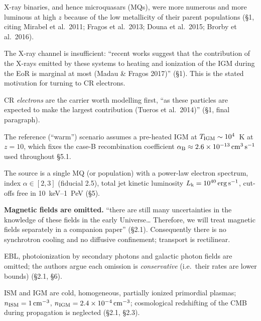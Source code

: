 \documentclass[11pt,a4paper]{article}
\begin{document}
\begin{description}[leftmargin=1.6cm,style=nextline,itemsep=3pt]
\item[\textbf{H1}] X-ray binaries, and hence microquasars (MQs), were more
  numerous and more luminous at high $z$ because of the low metallicity of
  their parent populations (\S1, citing Mirabel et al.\ 2011; Fragos et al.\
  2013; Douna et al.\ 2015; Brorby et al.\ 2016).
\item[\textbf{H2}] The X-ray channel is insufficient: ``recent works suggest
  that the contribution of the X-rays emitted by these systems to heating and
  ionization of the IGM during the EoR is marginal at most (Madau \& Fragos
  2017)'' (\S1). This is the stated motivation for turning to CR electrons.
\item[\textbf{H3}] CR \emph{electrons} are the carrier worth modelling first,
  ``as these particles are expected to make the largest contribution (Tueros
  et al.\ 2014)'' (\S1, final paragraph).
\item[\textbf{H4}] The reference (``warm'') scenario assumes a pre-heated IGM at
  $T_{\rm IGM}\sim10^{4}$~K at $z=10$, which fixes the case-B recombination
  coefficient $\alpha_{\rm B}\approx2.6\times10^{-13}\,{\rm cm^{3}\,s^{-1}}$
  used throughout \S5.1.
\item[\textbf{H5}] The source is a single MQ (or population) with a power-law
  electron spectrum, index $\alpha\in[2,3]$ (fiducial 2.5), total jet kinetic
  luminosity $L_{\rm k}=10^{40}\,{\rm erg\,s^{-1}}$, cut-offs free in
  10~keV--1~PeV (\S5).
\item[\textbf{H6}] \textbf{Magnetic fields are omitted.} ``there are still many
  uncertainties in the knowledge of these fields in the early Universe\dots
  Therefore, we will treat magnetic fields separately in a companion paper''
  (\S2.1). Consequently there is no synchrotron cooling and no diffusive
  confinement; transport is rectilinear.
\item[\textbf{H7}] EBL, photoionization by secondary photons and galactic
  photon fields are omitted; the authors argue each omission is
  \emph{conservative} (i.e.\ their rates are lower bounds) (\S2.1, \S6).
\item[\textbf{H8}] ISM and IGM are cold, homogeneous, partially ionized
  primordial plasmas; $n_{\rm ISM}=1\,{\rm cm^{-3}}$,
  $n_{\rm IGM}=2.4\times10^{-4}\,{\rm cm^{-3}}$; cosmological redshifting of
  the CMB during propagation is neglected (\S2.1, \S2.3).
\end{description}
\end{document}
